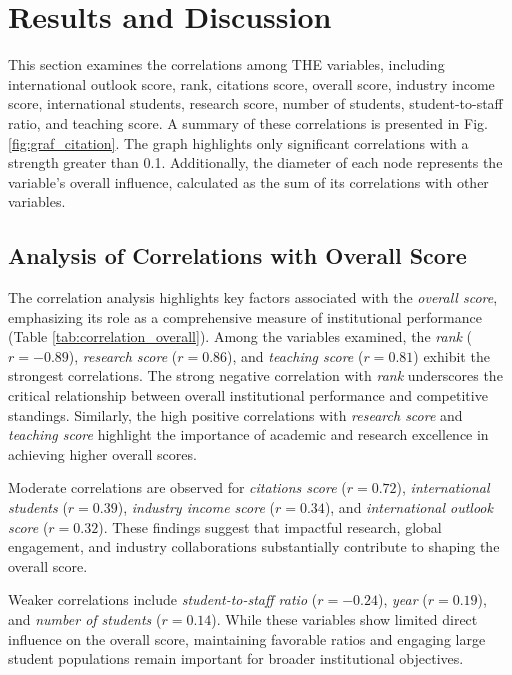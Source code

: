 \documentclass[conference]{IEEEtran}
\begin{document}
\section{Results and Discussion}
This section examines the correlations among THE variables, including international outlook score, rank, citations score, overall score, industry income score, international students, research score, number of students, student-to-staff ratio, and teaching score. A summary of these correlations is presented in Fig. \ref{fig:graf_citation}. The graph highlights only significant correlations with a strength greater than 0.1. Additionally, the diameter of each node represents the variable's overall influence, calculated as the sum of its correlations with other variables.


\subsection{Analysis of Correlations with Overall Score}

The correlation analysis highlights key factors associated with the \textit{overall score}, emphasizing its role as a comprehensive measure of institutional performance (Table \ref{tab:correlation_overall}). Among the variables examined, the \textit{rank} ($r = -0.89$), \textit{research score} ($r = 0.86$), and \textit{teaching score} ($r = 0.81$) exhibit the strongest correlations. The strong negative correlation with \textit{rank} underscores the critical relationship between overall institutional performance and competitive standings. Similarly, the high positive correlations with \textit{research score} and \textit{teaching score} highlight the importance of academic and research excellence in achieving higher overall scores.

Moderate correlations are observed for \textit{citations score} ($r = 0.72$), \textit{international students} ($r = 0.39$), \textit{industry income score} ($r = 0.34$), and \textit{international outlook score} ($r = 0.32$). These findings suggest that impactful research, global engagement, and industry collaborations substantially contribute to shaping the overall score.

Weaker correlations include \textit{student-to-staff ratio} ($r = -0.24$), \textit{year} ($r = 0.19$), and \textit{number of students} ($r = 0.14$). While these variables show limited direct influence on the overall score, maintaining favorable ratios and engaging large student populations remain important for broader institutional objectives.
\end{document}
